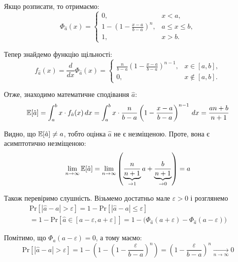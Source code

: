 \documentclass{hw_template}
\begin{document}
Якщо розписати, то отримаємо:
\begin{equation*}
    \Phi_{\hat{a}}(x) = 
    \begin{cases}
        0, & x < a, \\
        1 - \left(1 - \frac{x-a}{b-a}\right)^n, & a \leq x \leq b, \\
        1, & x > b.
    \end{cases}
\end{equation*}

Тепер знайдемо функцію щільності:
\begin{equation*}
    f_{\hat{a}}(x) = \frac{d}{dx} \Phi_{\hat{a}}(x) = 
    \begin{cases}
        \frac{n}{b-a}\left(1 - \frac{x-a}{b-a}\right)^{n-1}, & x \in [a,b], \\
        0, & x \not\in [a,b].
    \end{cases}
\end{equation*}

Отже, знаходимо математичне сподівання $\hat{a}$:
\begin{align*}
    \mathbb{E}[\hat{a}] = \int_{a}^{b} x \cdot f_{\hat{a}}(x) \, dx = \int_{a}^{b} x \cdot \frac{n}{b-a}\left(1 - \frac{x-a}{b-a}\right)^{n-1} \, dx = \frac{an + b}{n + 1}
\end{align*}

Видно, що $\mathbb{E}[\hat{a}] \neq a$, тобто оцінка $\hat{a}$ не є незміщеною. Проте, вона є асимптотично незміщеною:
\begin{align*}
    \lim_{n \to \infty} \mathbb{E}[\hat{a}] = \lim_{n \to \infty} \left(\underbrace{\frac{n}{n+1}}_{\to 1}a + \underbrace{\frac{b}{n+1}}_{\to 0}\right) = a
\end{align*}

Також перевіримо слушність. Візьмемо достатньо мале $\varepsilon > 0$ і розглянемо
\begin{align*}
    \text{Pr}\left[|\hat{a} - a| > \varepsilon\right] = 1 - \text{Pr}\left[|\hat{a}-a|\leq\varepsilon\right] \\= 1 - \text{Pr}\left[\hat{a} \in [a-\varepsilon, a+\varepsilon]\right] = 1 - \big(\Phi_{\hat{a}}(a+\varepsilon) - \Phi_{\hat{a}}(a-\varepsilon)\big)
\end{align*}

Помітимо, що $\Phi_{\hat{a}}(a-\varepsilon)=0$, а тому маємо:
\begin{equation*}
    \text{Pr}\left[|\hat{a} - a| > \varepsilon\right] = 1 - \left(1 - \left(1 - \frac{\varepsilon}{b-a}\right)^n\right) = \left(1 - \frac{\varepsilon}{b-a}\right)^n \xrightarrow[n \to \infty]{} 0
\end{equation*}
\end{document}
